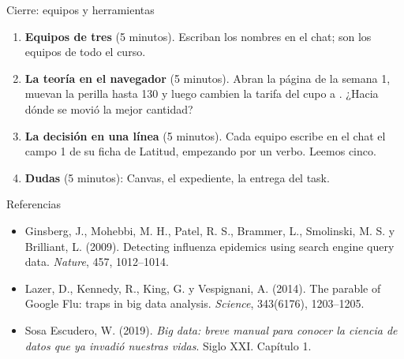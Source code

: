 \documentclass{beamer}
\begin{document}
\begin{frame}{Cierre: equipos y herramientas}
\begin{enumerate}\itemsep8pt
  \item \textbf{Equipos de tres} (5 minutos). Escriban los nombres en el chat; son los equipos de todo el curso.
  \item \textbf{La teoría en el navegador} (5 minutos). Abran la página de la semana 1, muevan la perilla hasta 130 y luego cambien la tarifa del cupo a . ¿Hacia dónde se movió la mejor cantidad?
  \item \textbf{La decisión en una línea} (5 minutos). Cada equipo escribe en el chat el campo 1 de su ficha de Latitud, empezando por un verbo. Leemos cinco.
  \item \textbf{Dudas} (5 minutos): Canvas, el expediente, la entrega del task.
\end{enumerate}
\end{frame}

\begin{frame}{Referencias}
\small
\begin{itemize}\itemsep5pt
  \item Ginsberg, J., Mohebbi, M. H., Patel, R. S., Brammer, L., Smolinski, M. S. y Brilliant, L. (2009). Detecting influenza epidemics using search engine query data. \emph{Nature}, 457, 1012--1014.
  \item Lazer, D., Kennedy, R., King, G. y Vespignani, A. (2014). The parable of Google Flu: traps in big data analysis. \emph{Science}, 343(6176), 1203--1205.
  \item Sosa Escudero, W. (2019). \emph{Big data: breve manual para conocer la ciencia de datos que ya invadió nuestras vidas}. Siglo XXI. Capítulo 1.
\end{itemize}
\end{frame}
\end{document}
